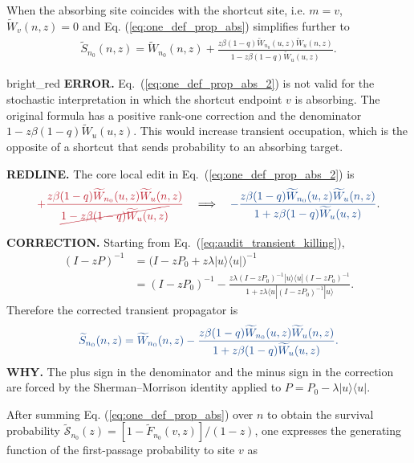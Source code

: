 \documentclass[10pt, hidelinks, superscriptaddress, amsmath, amssymb, aps, pre]{revtex4-2}
\newcommand{\auditlabel}[1]{\textbf{\textcolor{audit_blue}{#1}}}
\newcommand{\auditoriginal}[1]{\textcolor{bright_red}{#1}}
\newcommand{\auditcorrected}[1]{\textcolor{audit_blue}{#1}}
\newcommand{\auditmathwrong}[1]{\textcolor{bright_red}{\cancel{#1}}}
\newcommand{\auditarrow}{\quad\Longrightarrow\quad}
\begin{document}
When the absorbing site coincides with the shortcut site, i.e. $m=v$, $\widetilde{W}_{v}(n,z)=0$ and Eq. (\ref{eq:one_def_prop_abs}) simplifies further to
\begin{align}
\widetilde{S}_{n_0}(n,z)=\widetilde{W}_{n_0}(n,z)+\frac{z\beta (1-q)\widetilde{W}_{n_0}(u,z)\widetilde{W}_{u}(n,z)}{1-z\beta(1-q)\widetilde{W}_{u}(u,z)}.
\label{eq:one_def_prop_abs_2}
\end{align}
\begin{auditbox}{bright_red}
\auditlabel{ERROR.}  Eq.~(\ref{eq:one_def_prop_abs_2}) is not valid for the
stochastic interpretation in which the shortcut endpoint $v$ is absorbing.
The original formula has a positive rank-one correction and the denominator
$1-z\beta(1-q)\widetilde W_u(u,z)$.  This would increase transient occupation,
which is the opposite of a shortcut that sends probability to an absorbing
target.

\auditlabel{REDLINE.}  The core local edit in Eq.~(\ref{eq:one_def_prop_abs_2})
is
\begin{align}
\auditoriginal{
+\frac{z\beta(1-q)\widetilde W_{n_0}(u,z)\widetilde W_u(n,z)}
{\auditmathwrong{1-z\beta(1-q)\widetilde W_u(u,z)}}}
\auditarrow
\auditcorrected{
-\frac{z\beta(1-q)\widetilde W_{n_0}(u,z)\widetilde W_u(n,z)}
{1+z\beta(1-q)\widetilde W_u(u,z)}} .
\label{eq:audit_redline_prop}
\end{align}

\auditlabel{CORRECTION.}  Starting from
Eq.~(\ref{eq:audit_transient_killing}),
\begin{align}
(I-zP)^{-1}
&=\bigl(I-zP_0+z\lambda |u\rangle\langle u|\bigr)^{-1}\nonumber\\
&=(I-zP_0)^{-1}
-\frac{z\lambda (I-zP_0)^{-1}|u\rangle\langle u|(I-zP_0)^{-1}}
{1+z\lambda\langle u|(I-zP_0)^{-1}|u\rangle}.
\end{align}
Therefore the corrected transient propagator is
\begin{align}
\auditcorrected{
\widetilde{S}_{n_0}(n,z)=\widetilde{W}_{n_0}(n,z)
-\frac{z\beta(1-q)\widetilde{W}_{n_0}(u,z)\widetilde{W}_{u}(n,z)}
{1+z\beta(1-q)\widetilde{W}_{u}(u,z)}.}
\label{eq:audit_corrected_prop_abs}
\end{align}
\auditlabel{WHY.}  The plus sign in the denominator and the minus sign in the
correction are forced by the Sherman--Morrison identity applied to
$P=P_0-\lambda |u\rangle\langle u|$.
\end{auditbox}
After summing Eq. (\ref{eq:one_def_prop_abs}) over $n$ to obtain the survival probability $\widetilde{\mathcal{S}}_{n_0}(z)=\left[1-\widetilde{F}_{n_0}(v,z)\right]/(1-z)$, one expresses the generating function of the first-passage probability to site $v$ as
\end{document}
